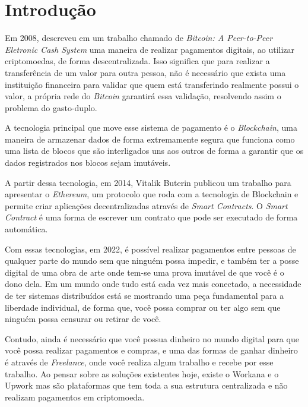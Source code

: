 \chapter{Introdução}

Em 2008, \citeauthor{bitcoin} descreveu em um trabalho chamado de \textit{Bitcoin: A Peer-to-Peer Eletronic Cash System} uma maneira de realizar pagamentos digitais, ao utilizar criptomoedas, de forma descentralizada. Isso significa que para realizar a transferência de um valor para outra pessoa, não é necessário que exista uma instituição financeira para validar que quem está transferindo realmente possui o valor, a própria rede do \textit{Bitcoin} garantirá essa validação, resolvendo assim o problema do gasto-duplo.

A tecnologia principal que move esse sistema de pagamento é o \textit{Blockchain}, uma maneira de armazenar dados de forma extremamente segura que funciona como uma lista de blocos que são interligados uns aos outros de forma a garantir que os dados registrados nos blocos sejam imutáveis.\cite{blockchain}

A partir dessa tecnologia, em 2014, Vitalik Buterin publicou um trabalho para apresentar o \textit{Ethereum}, um protocolo que roda com a tecnologia de Blockchain e permite criar aplicações decentralizadas através de \textit{Smart Contracts}. \cite{ethereum_yellow} O \textit{Smart Contract} é uma forma de escrever um contrato que pode ser executado de forma automática.\cite{smart_contract} \cite{smart_contract_blockchain}

Com essas tecnologias, em 2022, é possível realizar pagamentos entre pessoas de qualquer parte do mundo sem que ninguém possa impedir, e também ter a posse digital de uma obra de arte onde tem-se uma prova imutável de que você é o dono dela. Em um mundo onde tudo está cada vez mais conectado, a necessidade de ter sistemas distribuídos está se mostrando uma peça fundamental para a liberdade individual, de forma que, você possa comprar ou ter algo sem que ninguém possa censurar ou retirar de você.\cite{decentralization}

Contudo, ainda é necessário que você possua dinheiro no mundo digital para que você possa realizar pagamentos e compras, e uma das formas de ganhar dinheiro é através de \textit{Freelance}, onde você realiza algum trabalho e recebe por esse trabalho. Ao pensar sobre as soluções existentes hoje, existe o Workana e o Upwork mas são plataformas que tem toda a sua estrutura centralizada e não realizam pagamentos em criptomoeda.

